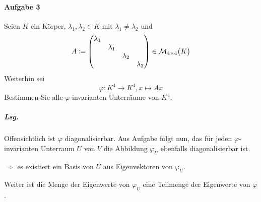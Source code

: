 \documentclass{scrreprt}
\begin{document}
\paragraph{Aufgabe 3} Seien $K$ ein Körper, $\lambda_1, \lambda_2 \in K$ mit
$\lambda_1 \ne \lambda_2$ und
\[
  A \coloneqq \begin{pmatrix}
    \lambda_1 & & & \\
    & \lambda_1 & & \\
    & & \lambda_2 & \\
    & & & \lambda_2 \\
  \end{pmatrix} \in \mathcal{M}_{4 \times 4}\qty\big(K)
\]
Weiterhin sei
\[
  \varphi \colon K^4 \to K^4, x \mapsto Ax
\]
Bestimmen Sie alle $\varphi$-invarianten Unterräume von $K^4$.

\subparagraph{Lsg.} Offensichtlich ist $\varphi$ diagonalisierbar.
Aus Aufgabe folgt nun, das für jeden $\varphi$-invarianten Unterraum $U$ von
$V$ die Abbildung $\varphi_U$ ebenfalls diagonalisierbar ist.

\noindent
$\Rightarrow$ es existiert ein Basis von $U$ aus Eigenvektoren von $\varphi_U$.

\noindent
Weiter ist die Menge der Eigenwerte von $\varphi_U$ eine Teilmenge der Eigenwerte
von $\varphi$.
\end{document}
